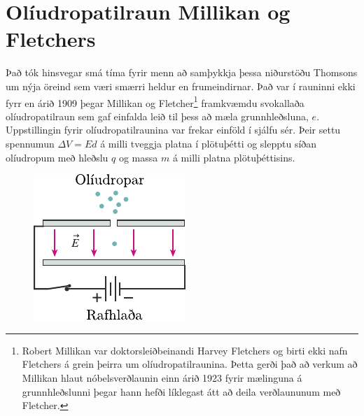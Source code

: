 \section{Olíudropatilraun Millikan og Fletchers}

Það tók hinsvegar smá tíma fyrir menn að samþykkja þessa niðurstöðu Thomsons um nýja öreind sem væri smærri heldur en frumeindirnar. Það var í rauninni ekki fyrr en árið 1909 þegar Millikan og Fletcher\footnote{Robert Millikan var doktorsleiðbeinandi Harvey Fletchers og birti ekki nafn Fletchers á grein þeirra um olíudropatilraunina. Þetta gerði það að verkum að Millikan hlaut nóbelsverðlaunin einn árið 1923 fyrir mælinguna á grunnhleðslunni þegar hann hefði líklegast átt að deila verðlaununum með Fletcher.} framkvæmdu svokallaða olíudropatilraun sem gaf einfalda leið til þess að mæla grunnhleðsluna, $e$. Uppstillingin fyrir olíudropatilraunina var frekar einföld í sjálfu sér. Þeir settu spennumun $\Delta V = Ed$ á milli tveggja platna í plötuþétti og slepptu síðan olíudropum með hleðslu $q$ og massa $m$ á milli platna plötuþéttisins.

\begin{figure}[H]
    \centering
    \includegraphics{figures/oliudropar.pdf}
\end{figure}

